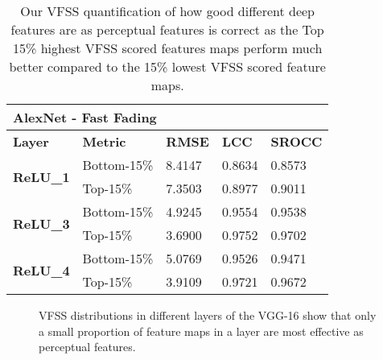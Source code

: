 \documentclass[10pt,twocolumn,letterpaper]{article}
\begin{document}
\begin{table*}[]
\centering
\caption{Our VFSS quantification of how good different deep features are as perceptual features is correct as the Top 15\% highest VFSS scored features maps perform much better compared to the 15\% lowest VFSS scored feature maps.}
\begin{tabular}{|l|l|l|l|l|}
\hline
\multicolumn{5}{|l|}{\textbf{AlexNet - Fast Fading}}                                                \\ \hline
\textbf{Layer}                    & \textbf{Metric} & \textbf{RMSE} & \textbf{LCC} & \textbf{SROCC} \\ \hline
\multirow{2}{*}{\textbf{ReLU\_1}} & Bottom-15\%             & 8.4147        & 0.8634       & 0.8573         \\ \cline{2-5}
                                  & Top-15\%             & 7.3503        & 0.8977       & 0.9011         \\ \hline
\multirow{2}{*}{\textbf{ReLU\_3}} & Bottom-15\%             & 4.9245        & 0.9554       & 0.9538         \\ \cline{2-5}
                                  & Top-15\%             & 3.6900        & 0.9752       & 0.9702         \\ \hline
\multirow{2}{*}{\textbf{ReLU\_4}} & Bottom-15\%             & 5.0769        & 0.9526       & 0.9471         \\ \cline{2-5}
                                  & Top-15\%             & 3.9109        & 0.9721       & 0.9672         \\ \hline
\end{tabular}
\end{table*}

\begin{figure*}[]
\centering
{}
  \hfill
  \hfill
  \hfill
  \hfill
  \hfill
  \hfill
  \caption{VFSS distributions in different layers of the VGG-16 show that only a small proportion of feature maps in a layer are most effective as perceptual features.}
\end{figure*}
\end{document}
